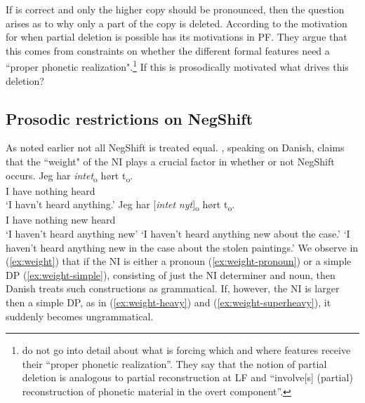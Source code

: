 \documentclass[12pt, letterpaper]{article}
\begin{document}
\z 
If \citet{chomskyMinimalistProgramLinguistic1993} is correct and only the higher copy should be pronounced, then the question arises as to why only a part of the copy is deleted. According to \citet{fanselowRemarksEconomyPronunciation2001,fanselowDistributedDeletion2002} the motivation for when partial deletion is possible has its motivations in PF. They argue that this comes from constraints on whether the different formal features need a ``proper phonetic realization".\footnote{\citet{fanselowRemarksEconomyPronunciation2001,fanselowDistributedDeletion2002} do not go into detail about what is forcing which and where features receive their ``proper phonetic realization''. They say that the notion of partial deletion is analogous to partial reconstruction at LF and ``involve[s] (partial) reconstruction of phonetic material in the overt component''.} If this is prosodically motivated what drives this deletion?

\subsection{Prosodic restrictions on NegShift} \label{sec:PROSODY}

As noted earlier not all NegShift is treated equal. \citet[65f]{christensenInterfacesNegationSyntax2005}, speaking on Danish, claims that the ``weight" of the NI plays a crucial factor in whether or not NegShift occurs. 
	\ea \label{ex:weight}
		\ea \label{ex:weight-pronoun}
		{\gll Jeg har \textit{intet}\textsubscript{o} hørt t\textsubscript{o}.\\
		I have nothing heard\\}
		\glt  `I havn't heard anything.'
		\ex \label{ex:weight-simple}
		\gll Jeg har [\textit{intet} \textit{nyt}]\textsubscript{o} hørt t\textsubscript{o}.\\
		I have nothing new heard\\
		\glt `I haven't heard anything new'
		\glt `I haven't heard anything new about the case.' \label{ex:weight-heavy}
		\glt `I haven't heard anything new in the case about the stolen paintings.' \label{ex:weight-superheavy}
		\z 
	\z
We observe in (\ref{ex:weight}) that if the NI is either a pronoun (\ref{ex:weight-pronoun}) or a simple DP (\ref{ex:weight-simple}), consisting of just the NI determiner and noun, then Danish treats such constructions as grammatical. If, however, the NI is larger then a simple DP, as in (\ref{ex:weight-heavy}) and (\ref{ex:weight-superheavy}), it suddenly becomes ungrammatical. 
\end{document}
